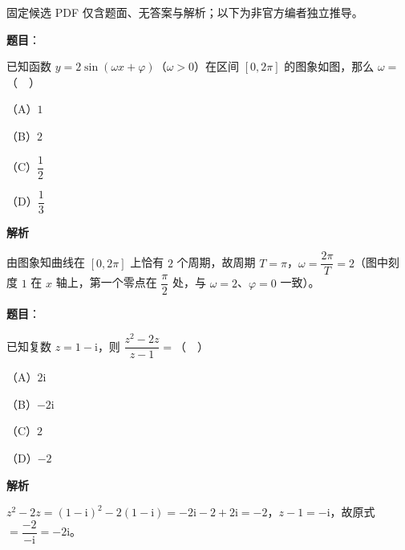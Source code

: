 

\begin{gktip}
固定候选 PDF 仅含题面、无答案与解析；以下为非官方编者独立推导。
\end{gktip}

\begin{answer}

\textbf{题目}：

已知函数 $y=2\sin(\omega x+\varphi)$（$\omega>0$）在区间 $[0,2\pi]$ 的图象如图，那么 $\omega=$（　）

（A）$1$

（B）$2$

（C）$\dfrac12$

（D）$\dfrac13$
\nopagebreak[4]
\begin{center}\end{center}
\nopagebreak[4]
\textbf{解析}

由图象知曲线在 $[0,2\pi]$ 上恰有 $2$ 个周期，故周期 $T=\pi$，$\omega=\dfrac{2\pi}T=2$（图中刻度 $1$ 在 $x$ 轴上，第一个零点在 $\dfrac\pi2$ 处，与 $\omega=2$、$\varphi=0$ 一致）。


\end{answer}
\begin{answer}

\textbf{题目}：

已知复数 $z=1-\mathrm i$，则 $\dfrac{z^2-2z}{z-1}=$（　）

（A）$2\mathrm i$

（B）$-2\mathrm i$

（C）$2$

（D）$-2$

\textbf{解析}

$z^2-2z=(1-\mathrm i)^2-2(1-\mathrm i)=-2\mathrm i-2+2\mathrm i=-2$，$z-1=-\mathrm i$，故原式 $=\dfrac{-2}{-\mathrm i}=-2\mathrm i$。


\end{answer}
